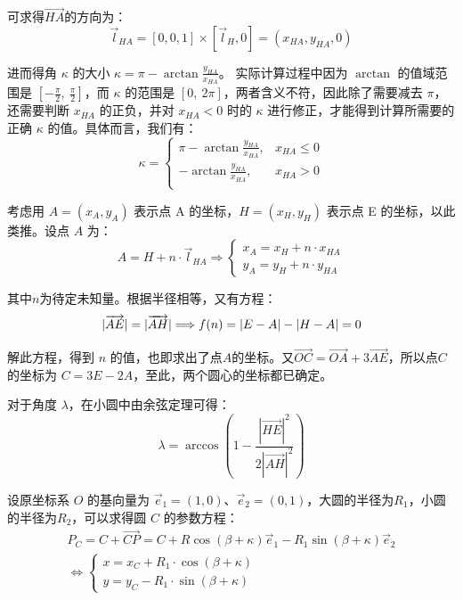 \documentclass[zihao=-4, UTF8]{article}		%
\theoremstyle{MyLineTheoremStyle} %
\theoremstyle{MyBlockTheoremStyle} %
\theoremstyle{MySubsubsectionStyle} %
\begin{document}
可求得$\overrightarrow{HA}$的方向为：
\begin{equation}
    \vec{l}_{HA}=[0,0,1]\times[\vec{l}_H,0]=(x_{HA}, y_{HA}, 0)
\end{equation}

进而得角 $\kappa$ 的大小 $ \kappa=\pi-\arctan{\frac{y_{HA}}{x_{HA}}}$。
实际计算过程中因为 $\arctan$ 的值域范围是 $[-\frac{\pi}{2},\ \frac{\pi}{2}]$，而 $\kappa$ 的范围是 $[0,\  2\pi]$，两者含义不符，因此除了需要减去 $\pi$，还需要判断 $x_{HA}$ 的正负，并对 $x_{HA} < 0$ 时的 $\kappa$ 进行修正，才能得到计算所需要的正确 $\kappa$ 的值。具体而言，我们有：
\begin{equation}
\kappa = 
\begin{cases}
    \pi-\arctan{\frac{y_{HA}}{x_{HA}}}, & x_{HA} \leqslant 0 \\
    -\arctan{\frac{y_{HA}}{x_{HA}}}, & x_{HA}>0 \\
\end{cases}
\end{equation}

考虑用 $A = (x_A, y_A)$ 表示点 A 的坐标，$H = (x_H, y_H)$ 表示点 E 的坐标，以此类推。设点 $A$ 为：
\begin{equation}
    A=H+n\cdot\vec{l}_{HA} \Longrightarrow 
    \begin{cases}
        x_A=x_H+n\cdot x_{HA}\\
        y_A=y_H+n\cdot y_{HA}
    \end{cases}
\end{equation}

其中$n$为待定未知量。根据半径相等，又有方程：
\begin{equation}
| \overrightarrow{AE} | = | \overrightarrow{AH} | \Longrightarrow  f(n) = \lvert E-A\rvert-\lvert H-A\rvert\notag=0
\end{equation}

解此方程，得到 $n$ 的值，也即求出了点$A$的坐标。又$\vec{OC}=\vec{OA}+3\vec{AE}$，所以点$C$的坐标为 $C = 3E - 2A$，至此，两个圆心的坐标都已确定。

对于角度 $\lambda$，在小圆中由余弦定理可得：
\begin{equation}
\lambda = \arccos{(1-\frac{| \overrightarrow{HE} |^{2}}{2 | \overrightarrow{AH} | ^{2}})}
\end{equation}

设原坐标系 $O$ 的基向量为 $\vec{e}_1=(1,0)$、$\vec{e}_2=(0,1)$，大圆的半径为$R_1$，小圆的半径为$R_2$，可以求得圆 $C$ 的参数方程：
\begin{gather}
P_C  = C + \overrightarrow{CP} = C + R\cos(\beta + \kappa)\vec{e}_1 - R_1\sin(\beta + \kappa)\vec{e}_2  \\ 
\Longleftrightarrow 
\begin{cases}
    x = x_C + R_1\cdot\cos{(\beta+\kappa)}\\
    y = y_C - R_1\cdot\sin{(\beta+\kappa)}
\end{cases}
\end{gather}
\end{document}
